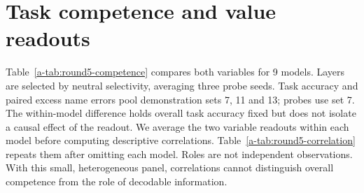 \section{Task competence and value readouts}
\label{a-app:round5-competence}
Table~\ref{a-tab:round5-competence} compares both variables for 9 models. Layers are selected by neutral selectivity, averaging three probe seeds. Task accuracy and paired excess name errors pool demonstration sets 7, 11 and 13; probes use set 7. The within-model difference holds overall task accuracy fixed but does not isolate a causal effect of the readout.
We average the two variable readouts within each model before computing descriptive correlations. Table~\ref{a-tab:round5-correlation} repeats them after omitting each model. Roles are not independent observations. With this small, heterogeneous panel, correlations cannot distinguish overall competence from the role of decodable information.
